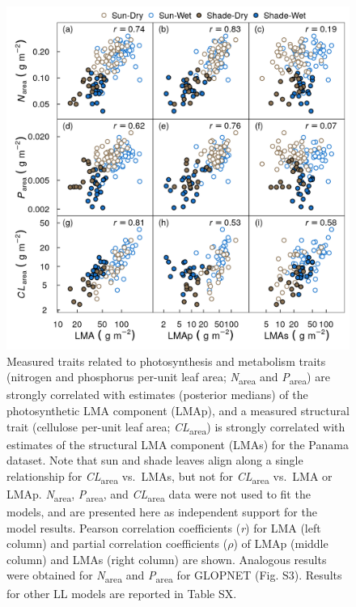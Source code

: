\documentclass[
  12pt,
  a4paper,
,tablecaptionabove
]{scrartcl}
\begin{document}
\begin{figure}

{\centering \includegraphics{../figs/pa_point_npc.png}

}

\caption{\label{fig-PA-NPC}Measured traits related to photosynthesis and
metabolism traits (nitrogen and phosphorus per-unit leaf area;
\emph{N}\textsubscript{area} and \emph{P}\textsubscript{area}) are
strongly correlated with estimates (posterior medians) of the
photosynthetic LMA component (LMAp), and a measured structural trait
(cellulose per-unit leaf area; \emph{CL}\textsubscript{area}) is
strongly correlated with estimates of the structural LMA component
(LMAs) for the Panama dataset. Note that sun and shade leaves align
along a single relationship for \emph{CL}\textsubscript{area} vs.~LMAs,
but not for \emph{CL}\textsubscript{area} vs.~LMA or LMAp.
\emph{N}\textsubscript{area}, \emph{P}\textsubscript{area}, and
\emph{CL}\textsubscript{area} data were not used to fit the models, and
are presented here as independent support for the model results. Pearson
correlation coefficients (\emph{r}) for LMA (left column) and partial
correlation coefficients (\(\rho\)) of LMAp (middle column) and LMAs
(right column) are shown. Analogous results were obtained for
\emph{N}\textsubscript{area} and \emph{P}\textsubscript{area} for
GLOPNET (Fig. S3). Results for other LL models are reported in Table
SX.}

\end{figure}
\end{document}
